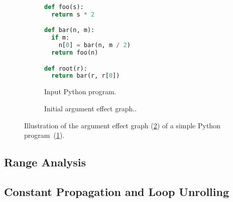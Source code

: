 \documentclass[10pt, preprint]{sigplanconf}
\begin{document}
\begin{figure}

    \begin{subfigure}{.5\textwidth}
        \begin{lstlisting}[language=python]
def foo(s):
  return s * 2

def bar(n, m):
  if m:
    n[0] = bar(n, m / 2)
  return foo(n)

def root(r):
  return bar(r, r[0])
        \end{lstlisting}
        \caption{Input Python program.}
        \label{fig:argument-effects-code}
    \end{subfigure}

    \begin{subfigure}{.5\textwidth}
        \centering
        \caption{Initial argument effect graph..}
        \label{fig:argument-effects-graph}
    \end{subfigure}

    \caption{Illustration of the argument effect graph (\ref{fig:argument-effects-graph}) of a simple Python program~(\ref{fig:argument-effects-code}).}
    \label{fig:argument-effects}

\end{figure}


\subsection{Range Analysis}

\subsection{Constant Propagation and Loop Unrolling}
\end{document}
